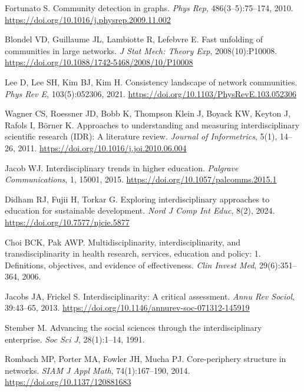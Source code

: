 \documentclass{bmcart}
\begin{document}
\begin{thebibliography}{99}
Fortunato S.
\newblock Community detection in graphs.
\newblock \emph{Phys Rep}, 486(3–5):75--174, 2010.
\newblock \url{https://doi.org/10.1016/j.physrep.2009.11.002}

Blondel VD, Guillaume JL, Lambiotte R, Lefebvre E.
\newblock Fast unfolding of communities in large networks.
\newblock \emph{J Stat Mech: Theory Exp}, 2008(10):P10008.
\newblock \url{https://doi.org/10.1088/1742-5468/2008/10/P10008}

Lee D, Lee SH, Kim BJ, Kim H.
\newblock Consistency landscape of network communities.
\newblock \emph{Phys Rev E}, 103(5):052306, 2021.
\newblock \url{https://doi.org/10.1103/PhysRevE.103.052306}

Wagner CS, Roessner JD, Bobb K, Thompson Klein J, Boyack KW, Keyton J, Rafols I, B{\"o}rner K.
\newblock Approaches to understanding and measuring interdisciplinary scientific research (IDR): A literature review.
\newblock \emph{Journal of Informetrics}, 5(1), 14--26, 2011.
\newblock \url{https://doi.org/10.1016/j.joi.2010.06.004}

Jacob WJ.
\newblock Interdisciplinary trends in higher education.
\newblock \emph{Palgrave Communications}, 1, 15001, 2015.
\newblock \url{https://doi.org/10.1057/palcomms.2015.1}

Didham RJ, Fujii H, Torkar G.
\newblock Exploring interdisciplinary approaches to education for sustainable development.
\newblock \emph{Nord J Comp Int Educ}, 8(2), 2024.
\newblock \url{https://doi.org/10.7577/njcie.5877}

Choi BCK, Pak AWP.
\newblock Multidisciplinarity, interdisciplinarity, and transdisciplinarity in health research, services, education and policy: 1. Definitions, objectives, and evidence of effectiveness.
\newblock \emph{Clin Invest Med}, 29(6):351--364, 2006.

Jacobs JA, Frickel S.
\newblock Interdisciplinarity: A critical assessment.
\newblock \emph{Annu Rev Sociol}, 39:43--65, 2013.
\newblock \url{https://doi.org/10.1146/annurev-soc-071312-145919}

Stember M.
\newblock Advancing the social sciences through the interdisciplinary enterprise.
\newblock \emph{Soc Sci J}, 28(1):1--14, 1991.

Rombach MP, Porter MA, Fowler JH, Mucha PJ.
\newblock Core-periphery structure in networks.
\newblock \emph{SIAM J Appl Math}, 74(1):167–190, 2014.
\newblock \url{https://doi.org/10.1137/120881683}


\end{thebibliography}
\end{document}
